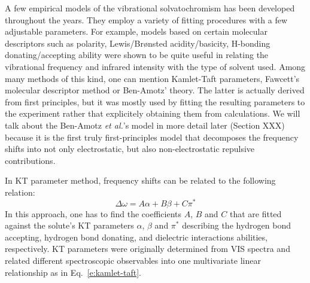 \documentclass[a4paper,titlepage,twoside,fleqn,12pt]{book}
\begin{document}
\begin{refsection}
A few empirical models of the vibrational solvatochromism has been developed throughout the years.
They employ a variety of fitting procedures with a few adjustable parameters. For example, 
models based on certain molecular descriptors such as polarity, Lewis\slash{}Br{\o}nsted acidity\slash{}basicity, 
H-bonding donating\slash{}accepting ability were shown to be quite useful in relating the vibrational
frequency and infrared intensity with the type of solvent used. Among many methods of this kind,
one can mention Kamlet\hyp{}Taft parameters\citep{Kamlet.Taft.JACS.1976,Taft.Kamlet.JACS.1976,Kamlet.Abboud.Taft.JACS.1977}, 
Fawcett's molecular descriptor method\citep{Reimers.Hall.JACS.1999,
Fawcett.Liu.Kessler.JPC.1993,Fawcett.Kloss.JCP.1996} or Ben-Amotz' theory.\citep{Ben-Amotz.Lee.Cho.List.JCP.1992} 
The latter is actually derived from first principles, but it was mostly used by fitting
the resulting parameters to the experiment rather that explicitely obtaining them from calculations.
We will talk about the Ben-Amotz \emph{et al.}'s model in more detail later (Section XXX) because it is the first
truly first\hyp{}principles model that decomposes the frequency shifts into not only electrostatic, 
but also non-electrostatic repulsive contributions.

In KT parameter method, frequency shifts can be related to the following
relation\citep{Zhang.Markiewicz.Doerksen.Smith.Gai.PCCP.2015}:
%
\begin{equation} \label{e:kamlet-taft}
\Delta \omega = A\alpha + B\beta + C\pi^{*}
\end{equation}
%
In this approach, one has to
find the coefficients $A$, $B$ and $C$ that are fitted against
the solute's KT parameters $\alpha$\citep{Taft.Kamlet.JACS.1976}, 
$\beta$\citep{Kamlet.Taft.JACS.1976} and $\pi^{*}$\citep{Kamlet.Abboud.Taft.JACS.1977} 
describing the hydrogen bond accepting,
hydrogen bond donating, and dielectric interactions abilities, respectively.
KT parameters were originally determined from VIS spectra and related different
spectroscopic observables into one multivariate linear relationship as in Eq.~\eqref{e:kamlet-taft}.


\end{refsection}
\end{document}
